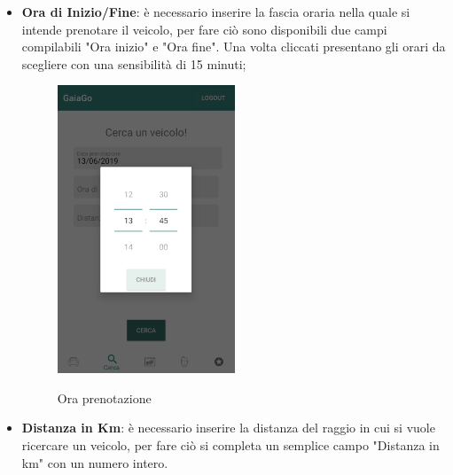 \begin{itemize}
 \item \textbf{Ora di Inizio/Fine}: è necessario inserire la fascia oraria nella quale si intende prenotare il veicolo, per fare ciò sono disponibili due campi compilabili "Ora inizio" e "Ora fine". Una volta cliccati presentano gli orari da scegliere con una sensibilità di 15 minuti;
  \begin{figure}[H] 
 	\centering 
 	\includegraphics[width=0.5\textwidth]{res/images/ora_inizio.png}\\
 	\caption{Ora prenotazione}
 	\label{ora}
 \end{figure}
 
 \item \textbf{Distanza in Km}: è necessario inserire la distanza del raggio in cui si vuole ricercare un veicolo, per fare ciò si completa un semplice campo "Distanza in km" con un numero intero.
\end{itemize}
\pagebreak

